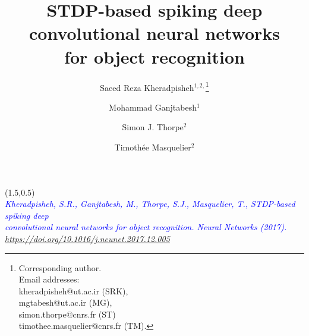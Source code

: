 \documentclass[preprint,5p,12pt,twocolumn]{article}
\begin{document}
\begin{textblock}{30}(1.5,0.5)
\\
\textit{\textcolor{blue}{Kheradpisheh, S.R., Ganjtabesh, M., Thorpe, S.J., Masquelier, T.,
STDP-based spiking deep \\convolutional neural networks for object recognition. Neural Networks (2017).\\ \url{https://doi.org/10.1016/j.neunet.2017.12.005}} }
\end{textblock}


\title{STDP-based spiking deep convolutional neural networks\\ for object recognition}


\author{Saeed Reza Kheradpisheh$ ^{1,2,}$\footnote{Corresponding author.\\ Email addresses:\\ kheradpisheh@ut.ac.ir (SRK), \\ mgtabesh@ut.ac.ir (MG),\\ simon.thorpe@cnrs.fr (ST)\\ timothee.masquelier@cnrs.fr (TM).} }
\author{Mohammad Ganjtabesh$ ^{1}$}
\author{Simon J. Thorpe$ ^{2}$}
\author{Timoth\'ee Masquelier$ ^{2}$}

\date{}
\end{document}
